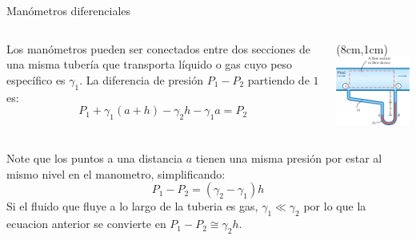 \documentclass [xcolor=svgnames, t] {beamer}
\begin{document}
\begin{frame}{Man\'ometros diferenciales}
\vspace{-0.4cm}
\begin{columns}
Los man\'ometros pueden ser conectados entre dos secciones de una misma tuber\'ia  que transporta l\'iquido o gas cuyo peso espec\'ifico es $\gamma_1$. La diferencia de presi\'on $P_1 - P_2$ partiendo de $1$ es:
$$
P_1 + \gamma_1 (a+h) - \gamma_2 h - \gamma_1 a = P_2
$$
\vspace{0.5cm}
\begin{textblock*}{4.5cm}(8cm,1cm) %
\includegraphics[width=\textwidth]{mano4}
\end{textblock*}
\end{columns}
Note que los puntos a una distancia $a$ tienen una misma presi\'on por estar al mismo nivel en el manometro, simplificando:
$$
P_1 - P_2 = (\gamma_2 - \gamma_1)h
$$
Si el fluido que fluye a lo largo de la tuberia es gas, $\gamma_1 \ll \gamma_2$ por lo que la ecuacion anterior se convierte en $P_1-P_2 \cong \gamma_2 h$.
\end{frame}
\end{document}
